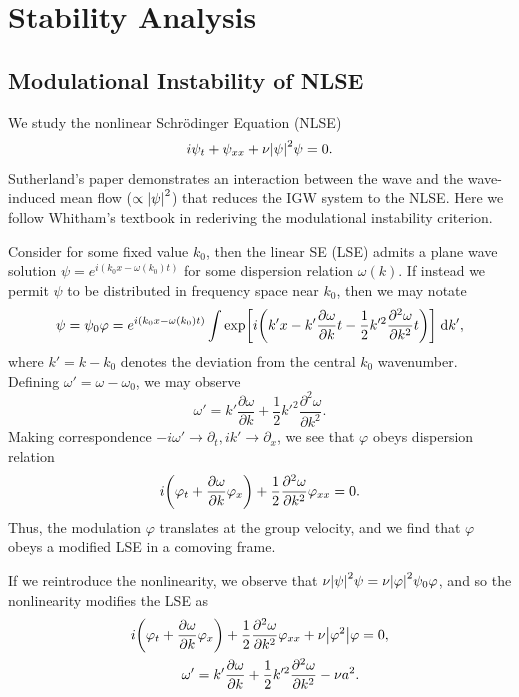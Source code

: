 \documentclass[11pt,
        usenames, %
        dvipsnames %
    ]{report}
\newcommand*{\pd}[2]{\frac{\partial#1}{\partial#2}}
\newcommand*{\ptd}[2]{\frac{\partial^2 #1}{\partial#2^2}}
\DeclarePairedDelimiter\abs{\lvert}{\rvert}
\DeclarePairedDelimiter\p{\lparen}{\rparen}
\DeclarePairedDelimiter\s{\lbrack}{\rbrack}
\begin{document}
\chapter{Stability Analysis}

\section{Modulational Instability of NLSE}

We study the nonlinear Schr\"odinger Equation (NLSE)
\begin{equation}
    i\psi_t + \psi_{xx} + \nu \abs*{\psi}^2\psi = 0.
\end{equation}
Sutherland's paper demonstrates an interaction between the wave and the
wave-induced mean flow ($\propto \abs*{\psi}^2$) that reduces the IGW system to
the NLSE\@. Here we follow Whitham's textbook in rederiving the modulational
instability criterion.

Consider for some fixed value $k_0$, then the linear SE (LSE) admits a plane
wave solution $\psi = e^{i(k_0x - \omega(k_0)t)}$ for some dispersion relation
$\omega(k)$. If instead we permit $\psi$ to be distributed in frequency space
near $k_0$, then we may notate
\begin{equation}
    \psi = \psi_0 \varphi = e^{i(k_0x - \omega(k_0) t)} \int\limits
        \exp\s*{i\p*{k' x - k'\pd{\omega}{k}t -
            \frac{1}{2}k'^2 \ptd{\omega}{k}t}}\;\mathrm{d}k',
\end{equation}
where $k' = k - k_0$ denotes the deviation from the central $k_0$
wavenumber. Defining $\omega' = \omega - \omega_0$, we may observe
\begin{equation}
    \omega' = k' \pd{\omega}{k} + \frac{1}{2}k'^2 \ptd{\omega}{k}.
\end{equation}
Making correspondence $-i\omega' \to \partial_t, ik' \to \partial_x$, we see
that $\varphi$ obeys dispersion relation
\begin{equation}
    i\p*{\varphi_t + \pd{\omega}{k}\varphi_x}
        + \frac{1}{2}\ptd{\omega}{k}\varphi_{xx} = 0.
\end{equation}
Thus, the modulation $\varphi$ translates at the group velocity, and we find
that $\varphi$ obeys a modified LSE in a comoving frame.

If we reintroduce the nonlinearity, we observe that $\nu \abs*{\psi}^2\psi = \nu
\abs*{\varphi}^2 \psi_0\varphi$, and so the nonlinearity modifies the LSE as
\begin{align}
    i\p*{\varphi_t + \pd{\omega}{k}\varphi_x}
        + \frac{1}{2}\ptd{\omega}{k}\varphi_{xx}
        + \nu \abs*{\varphi^2}\varphi &= 0,\\
    \omega' = k' \pd{\omega}{k} + \frac{1}{2}k'^2 \ptd{\omega}{k}
        - \nu a^2.\label{eq:nlse_disp}
\end{align}
\end{document}
